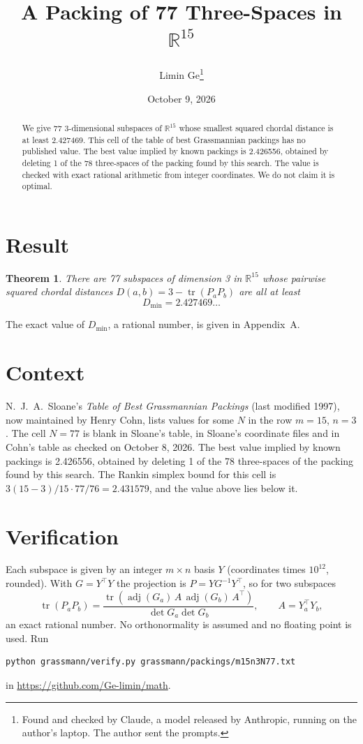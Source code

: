\documentclass[11pt,a4paper]{article}
\title{A Packing of 77 Three-Spaces in $\mathbb{R}^{15}$}
\author{Limin Ge\thanks{Found and checked by Claude, a model released by Anthropic, running on the author's laptop. The author sent the prompts.}}
\date{October 9, 2026}
\newtheorem*{theorem}{Theorem}
\begin{document}
\maketitle
\begin{abstract}
We give 77 3-dimensional subspaces of $\mathbb{R}^{15}$ whose smallest squared chordal distance is at least 2.427469. This cell of the table of best Grassmannian packings has no published value. The best value implied by known packings is 2.426556, obtained by deleting 1 of the 78 three-spaces of the packing found by this search. The value is checked with exact rational arithmetic from integer coordinates. We do not claim it is optimal.
\end{abstract}

\section{Result}
\begin{theorem}
There are 77 subspaces of dimension 3 in $\mathbb{R}^{15}$ whose pairwise squared chordal distances $D(a,b) = 3 - \operatorname{tr}(P_aP_b)$ are all at least
\[ D_{\min} = 2.427469\ldots \]
\end{theorem}
The exact value of $D_{\min}$, a rational number, is given in Appendix~A.


\section{Context}
N.~J.~A.~Sloane's \emph{Table of Best Grassmannian Packings} (last modified 1997), now maintained by Henry Cohn, lists values for some $N$ in the row $m=15$, $n=3$. The cell $N=77$ is blank in Sloane's table, in Sloane's coordinate files and in Cohn's table as checked on October 8, 2026. The best value implied by known packings is 2.426556, obtained by deleting 1 of the 78 three-spaces of the packing found by this search. The Rankin simplex bound for this cell is $3(15-3)/15\cdot 77/76 = 2.431579$, and the value above lies below it.


\section{Verification}
Each subspace is given by an integer $m\times n$ basis $Y$ (coordinates times $10^{12}$, rounded). With $G=Y^\top Y$ the projection is $P=YG^{-1}Y^\top$, so for two subspaces
\[ \operatorname{tr}(P_aP_b)=\frac{\operatorname{tr}(\operatorname{adj}(G_a)\,A\,\operatorname{adj}(G_b)\,A^\top)}{\det G_a\det G_b},\qquad A=Y_a^\top Y_b, \]
an exact rational number. No orthonormality is assumed and no floating point is used. Run
\begin{verbatim}
python grassmann/verify.py grassmann/packings/m15n3N77.txt
\end{verbatim}
in \url{https://github.com/Ge-limin/math}.
\end{document}
